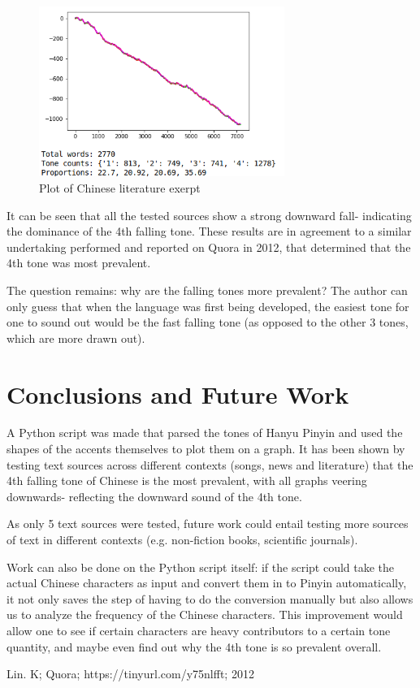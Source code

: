\documentclass[11pt, a4paper]{article}
\begin{document}
    \begin{figure}[H]
      \includegraphics[width=8cm]{liafs}
      \centering
      \caption{Plot of Chinese literature exerpt}
    \end{figure}

    It can be seen that all the tested sources show a strong downward fall- indicating the dominance of the 4th falling tone. These results are in agreement to a similar undertaking performed and reported on Quora in 2012, that determined that the 4th tone was most prevalent.\cite{quora}

    The question remains: why are the falling tones more prevalent? The author can only guess that when the language was first being developed, the easiest tone for one to sound out would be the fast falling tone (as opposed to the other 3 tones, which are more drawn out).

    \section{Conclusions and Future Work}
      A Python script was made that parsed the tones of Hanyu Pinyin and used the shapes of the accents themselves to plot them on a graph. It has been shown by testing text sources across different contexts (songs, news and literature) that the 4th falling tone of Chinese is the most prevalent, with all graphs veering downwards- reflecting the downward sound of the 4th tone.

      As only 5 text sources were tested, future work could entail testing more sources of text in different contexts (e.g. non-fiction books, scientific journals).

      Work can also be done on the Python script itself: if the script could take the actual Chinese characters as input and convert them in to Pinyin automatically, it not only saves the step of having to do the conversion manually but also allows us to analyze the frequency of the Chinese characters. This improvement would allow one to see if certain characters are heavy contributors to a certain tone quantity, and maybe even find out why the 4th tone is so prevalent overall.

    \begin{thebibliography}{1}
      Lin. K; Quora; https://tinyurl.com/y75nlfft; 2012
    \end{thebibliography}
\end{document}
